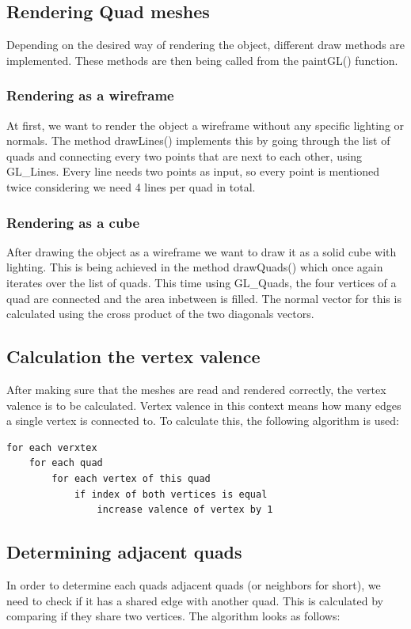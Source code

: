 \documentclass[12pt,a4paper]{scrartcl}
\begin{document}
\subsection{Rendering Quad meshes}
Depending on the desired way of rendering the object, different draw methods are implemented. These methods are then being called from the paintGL() function.

\subsubsection{Rendering as a wireframe}
At first, we want to render the object a wireframe without any specific lighting or normals. The method drawLines() implements this by going through the list of quads and connecting every two points that are next to each other, using GL_Lines. Every line needs two points as input, so every point is mentioned twice considering we need 4 lines per quad in total.

\subsubsection{Rendering as a cube}
After drawing the object as a wireframe we want to draw it as a solid cube with lighting. This is being achieved in the method drawQuads() which once again iterates over the list of quads. This time using GL_Quads, the four vertices of a quad are connected and the area inbetween is filled. The normal vector for this is calculated using the cross product of the two diagonals vectors.

\subsection{Calculation the vertex valence}
After making sure that the meshes are read and rendered correctly, the vertex valence is to be calculated. Vertex valence in this context means how many edges a single vertex is connected to. To calculate this, the following algorithm is used:


\begin{lstlisting}[language=PSEUDO]
for each verxtex 
	for each quad 
 		for each vertex of this quad
   			if index of both vertices is equal 
   				increase valence of vertex by 1
\end{lstlisting}

\subsection{Determining adjacent quads}
In order to determine each quads adjacent quads (or neighbors for short), we need to check if it has a shared edge with another quad. This is calculated by comparing if they share two vertices. The algorithm looks as follows:
\end{document}
